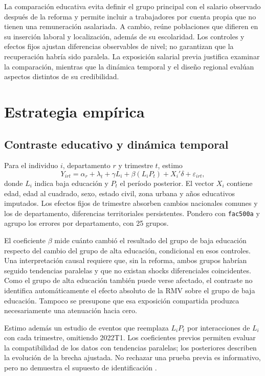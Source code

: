 La comparación educativa evita definir el grupo principal con el salario observado después de la reforma y permite incluir a trabajadores por cuenta propia que no tienen una remuneración asalariada. A cambio, reúne poblaciones que difieren en su inserción laboral y localización, además de su escolaridad. Los controles y efectos fijos ajustan diferencias observables de nivel; no garantizan que la recuperación habría sido paralela. La exposición salarial previa justifica examinar la comparación, mientras que la dinámica temporal y el diseño regional evalúan aspectos distintos de su credibilidad.

\section{Estrategia empírica}

\subsection{Contraste educativo y dinámica temporal}

Para el individuo $i$, departamento $r$ y trimestre $t$, estimo
\begin{equation}
Y_{irt}=\alpha_r+\lambda_t+\gamma L_i+\beta(L_iP_t)+X_i'\delta+\varepsilon_{irt},
\label{eq:short_did}
\end{equation}
donde $L_i$ indica baja educación y $P_t$ el período posterior. El vector $X_i$ contiene edad, edad al cuadrado, sexo, estado civil, zona urbana y años educativos imputados. Los efectos fijos de trimestre absorben cambios nacionales comunes y los de departamento, diferencias territoriales persistentes. Pondero con \texttt{fac500a} y agrupo los errores por departamento, con 25 grupos.

El coeficiente $\beta$ mide cuánto cambió el resultado del grupo de baja educación respecto del cambio del grupo de alta educación, condicional en esos controles. Una interpretación causal requiere que, sin la reforma, ambos grupos habrían seguido tendencias paralelas y que no existan shocks diferenciales coincidentes. Como el grupo de alta educación también puede verse afectado, el contraste no identifica automáticamente el efecto absoluto de la RMV sobre el grupo de baja educación. Tampoco se presupone que esa exposición compartida produzca necesariamente una atenuación hacia cero.

Estimo además un estudio de eventos que reemplaza $L_iP_t$ por interacciones de $L_i$ con cada trimestre, omitiendo 2022T1. Los coeficientes previos permiten evaluar la compatibilidad de los datos con tendencias paralelas; los posteriores describen la evolución de la brecha ajustada. No rechazar una prueba previa es informativo, pero no demuestra el supuesto de identificación \citep{roth_2022_pretest}.


